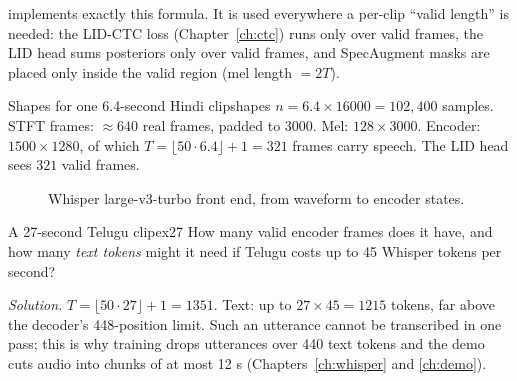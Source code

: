 \begin{incode}
 implements exactly this formula. It is used everywhere a per-clip ``valid length'' is
needed: the LID-CTC loss (Chapter~\ref{ch:ctc}) runs only over valid frames, the LID head sums posteriors only over valid frames,
and SpecAugment masks are placed only inside the valid region (mel length $=2T$).
\end{incode}

\begin{example}{Shapes for one 6.4-second Hindi clip}{shapes}
$n=6.4\times16000=102{,}400$ samples. STFT frames: $\approx 640$ real frames, padded to 3000. Mel: $128\times 3000$. Encoder:
$1500\times1280$, of which $T=\lfloor 50\cdot 6.4\rfloor+1=321$ frames carry speech. The LID head sees $321$ valid frames.
\end{example}

\begin{figure}[h]
\centering
{}
\caption{Whisper large-v3-turbo front end, from waveform to encoder states.}
\end{figure}

\begin{exercise}{A 27-second Telugu clip}{ex27}
How many valid encoder frames does it have, and how many \emph{text tokens} might it need if Telugu costs up to 45 Whisper tokens
per second?\par
\textit{Solution.} $T=\lfloor 50\cdot 27\rfloor+1=1351$. Text: up to $27\times 45=1215$ tokens, far above the decoder's 448-position
limit. Such an utterance cannot be transcribed in one pass; this is why training drops utterances over 440 text tokens and the demo
cuts audio into chunks of at most 12 s (Chapters~\ref{ch:whisper} and \ref{ch:demo}).
\end{exercise}
